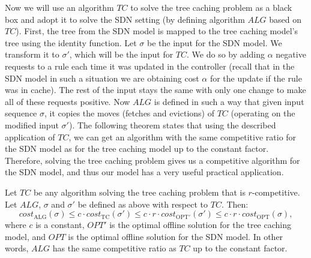 Now we will use an algorithm $TC$ to solve the tree caching problem as a black
box and adopt it to solve the SDN setting (by defining algorithm $ALG$ based on
$TC$). First, the tree from the SDN model is mapped to the tree caching model's
tree using the identity function. Let $\sigma$ be the input for the SDN model. We
transform it to $\sigma'$, which will be the input for $TC$. We do so by adding
$\alpha$ negative requests to a rule each time it was updated in the
controller (recall that in the SDN model in such a situation we are obtaining
cost $\alpha$ for the update if the rule was in cache). The rest of the input
stays the same with only one change to make all of these requests positive. Now
$ALG$ is defined in such a way that given input sequence $\sigma$, it copies the
moves (fetches and evictions) of $TC$ (operating on the  modified input $\sigma'$). The
following theorem states that using the described application of $TC$, we can
get an algorithm with the same competitive ratio for the SDN model as for the
tree caching model up to the constant factor. Therefore, solving the tree
caching problem gives us a competitive algorithm for the SDN model, and thus 
our model has a very useful practical application.  \begin{theorem} Let
$TC$ be any algorithm solving the tree caching problem that is $r$-competitive.
Let $ALG$, $\sigma$ and $\sigma'$ be defined as above with respect to $TC$.
Then: $$cost_{\mathrm{ALG}}(\sigma) \leq c \cdot cost_{\mathrm{TC}}(\sigma')
\leq c \cdot r \cdot cost_{\mathrm{OPT'}}(\sigma') \leq c \cdot r \cdot
cost_{\mathrm{OPT}}(\sigma),$$ where $c$ is a constant, $OPT'$ is the
optimal offline solution for the tree caching model, and $OPT$ is the
optimal offline solution for the SDN model. In other words, $ALG$ has the same
competitive ratio as $TC$ up to the constant factor.  \end{theorem}
